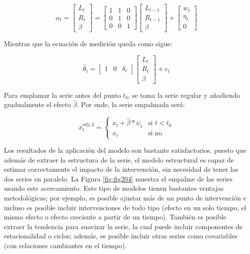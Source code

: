 \documentclass[
  12pt,
]{book}
\begin{document}
\[
\alpha_t=\begin{bmatrix}
L_t\\
R_t\\
\beta
\end{bmatrix}=\begin{bmatrix}
1&1&0\\
0&1&0\\
0&0&1
\end{bmatrix}
\begin{bmatrix}
L_{t-1}\\
R_{t-1}\\
\beta
\end{bmatrix}+
\begin{bmatrix}
w_t\\
\eta_t\\
0
\end{bmatrix}
\]

Mientras que la ecuación de medición queda como sigue:

\[
\hat \theta_{t}=\begin{bmatrix}
1&0&\delta_t
\end{bmatrix}\begin{bmatrix}
L_t\\
R_t\\
\beta
\end{bmatrix}+e_t
\]

Para emplamar la serie antes del punto \(t_b\), se toma la serie regular y añadiendo gradualmente el efecto \(\hat{\beta}\). Por ende, la serie empalmada será:

\[
x^{adj,2}_t=
\begin{cases}
x_t+\hat{\beta}*\psi_t&\text{si $t<t_0$}\\
x_t&\text{si no}
\end{cases}
\]

Los resultados de la aplicación del modelo son bastante satisfactorios, puesto que además de extraer la estructura de la serie, el modelo estructural es capaz de estimar correctamente el impacto de la intervención, sin necesidad de tener las dos series en paralelo. La Figura \ref{fig:fig204} muestra el empalme de las series usando este acercamiento. Este tipo de modelos tienen bastantes ventajas metodológicas; por ejemplo, es posible ajustar más de un punto de intervención e incluso es posible incluir intervenciones de todo tipo (efecto en un solo tiempo, el mismo efecto o efecto creciente a partir de un tiempo). También es posible extraer la tendencia para suavizar la serie, la cual puede incluir componentes de estacionalidad o ciclos; además, es posible incluir otras series como covariables (con relaciones cambiantes en el tiempo).
\end{document}
